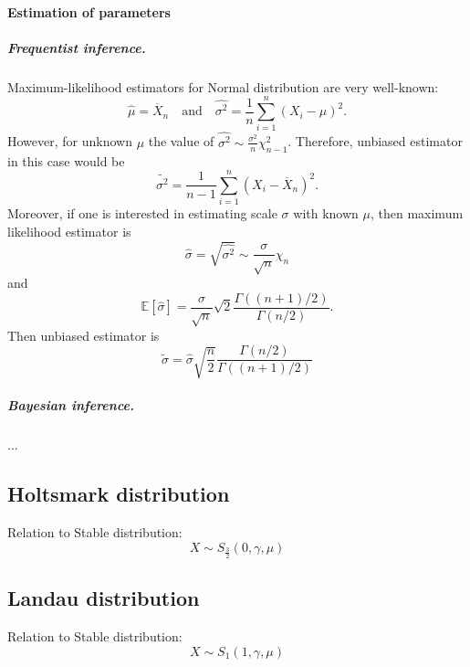 \documentclass[a4paper,11pt]{article}
\theoremstyle{plain}
\theoremstyle{definition}
\newcommand{\ME}{\mathbb{E}}
\begin{document}
\paragraph{Estimation of parameters}
\subparagraph{Frequentist inference.} Maximum-likelihood estimators for Normal distribution are very well-known:
\[
\hat{\mu} = \overline{X}_n \quad \text{and} \quad \hat{\sigma^2} = \frac{1}{n} \sum_{i=1}^{n} (X_i - \mu)^2.
\]
However, for unknown $\mu$ the value of $\hat{\sigma^2} \sim \frac{\sigma^2}{n}\chi^2_{n-1}$. Therefore, unbiased estimator in this case would be
\[
\widetilde{\sigma^2} = \frac{1}{n-1} \sum_{i=1}^{n} (X_i - \overline{X}_n)^2.
\]
Moreover, if one is interested in estimating scale $\sigma$ with known $\mu$, then maximum likelihood estimator is
\[
\hat{\sigma} = \sqrt{\hat{\sigma^2}} \sim \frac{\sigma}{\sqrt{n}} \chi_{n}
\]
and
\[
\ME[\hat{\sigma}] = \frac{\sigma}{\sqrt{n}} \sqrt{2} \frac{\Gamma((n+1)/2)}{\Gamma(n/2)}.
\]
Then unbiased estimator is
\[
\widetilde{\sigma} = \hat{\sigma} \sqrt{\frac{n}{2}} \frac{\Gamma(n/2)}{\Gamma((n+1)/2)}
\]

\subparagraph{Bayesian inference.}
...

\subsection{Holtsmark distribution}
	Relation to Stable distribution:
	\[X \sim S_{\frac{3}{2}}(0, \gamma, \mu) \]


\subsection{Landau distribution}
	Relation to Stable distribution:
	\[X \sim S_{1}(1, \gamma, \mu) \]
	

\pagebreak
\end{document}
